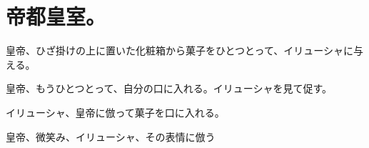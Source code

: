 \section*{帝都皇室。}

皇帝、ひざ掛けの上に置いた化粧箱から菓子をひとつとって、イリューシャに与える。

皇帝、もうひとつとって、自分の口に入れる。イリューシャを見て促す。

イリューシャ、皇帝に倣って菓子を口に入れる。

皇帝、微笑み、イリューシャ、その表情に倣う
